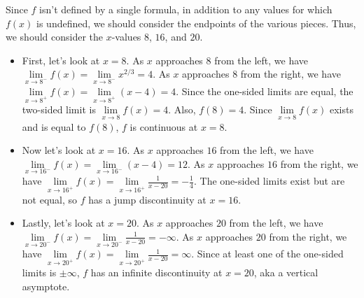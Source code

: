 \documentclass{article}
\begin{document}
\begin{enumerate}[resume]
  \begin{solution}
    Since $f$ isn't defined by a single formula, in addition to any values for which $f(x)$ 
    is undefined, we should consider the endpoints of the various pieces. Thus, we
    should consider the $x$-values $8$, $16$, and $20$. 

    \begin{itemize}

    \item
    First, let's look at $x=8$. As $x$ approaches $8$ from the left, we have
    $\lim\limits_{x \to 8^-} f(x) = \lim\limits_{x \to 8^-} x^{2/3} = 4$. 
    As $x$ approaches $8$ from the right,
    we have $\lim\limits_{x \to 8^+} f(x) =\lim\limits_{x \to 8^+} (x-4) = 4$.
    Since the one-sided limits are equal, the two-sided limit is 
    $\lim\limits_{x \to 8} f(x) =4$. Also, $f(8) = 4$. Since 
    $\lim\limits_{x \to 8} f(x)$ exists and is equal to $f(8)$, $f$ is continuous
    at $x=8$. 
    
    \item
    Now let's look at $x=16$. As $x$ approaches $16$ from the left, we have
    $\lim\limits_{x \to 16^-} f(x) = \lim\limits_{x \to 16^-} (x-4) = 12$. 
    As $x$ approaches $16$ from the right,
    we have $\lim\limits_{x \to 16^+} f(x) =\lim\limits_{x \to 16^+} \frac{1}{x-20}=
    -\frac{1}{4}$. The one-sided limits exist but are not equal, so $f$ has a jump
    discontinuity at $x=16$.

    \item
    Lastly, let's look at $x=20$. As $x$ approaches $20$ from the left, we have
    $\lim\limits_{x \to 20^-} f(x) = \lim\limits_{x \to 20^-} \frac{1}{x-20} = -\infty$. 
    As $x$ approaches $20$ from the right,
    we have $\lim\limits_{x \to 20^+} f(x) =\lim\limits_{x \to 20^+} \frac{1}{x-20}=
    \infty$. Since at least one of the one-sided limits is $\pm \infty$, $f$ has an infinite
    discontinuity at $x=20$, aka a vertical asymptote. 

    \end{itemize}
    
  \end{solution}

\end{enumerate}
\end{document}
